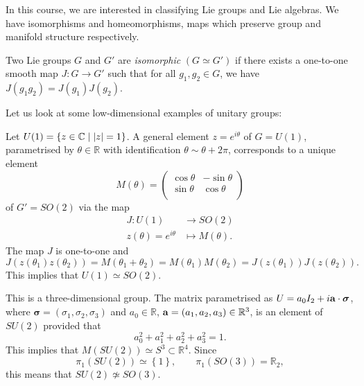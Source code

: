 In this course, we are interested in classifying Lie groups and Lie algebras. We have isomorphisms and homeomorphisms, maps which preserve group and manifold structure respectively.

\begin{definition}[isomorphism]
  Two Lie groups $G$ and $G'$ are \emph{isomorphic} $(G \simeq G')$ if there exists a one-to-one smooth map $J : G \to G'$ such that for all $g_1, g_2 \in G$, we have $J(g_1 g_2) = J(g_1) J(g_2)$.
\end{definition}

Let us look at some low-dimensional examples of unitary groups:
\begin{example}[$G = U(1)$]
  Let $U(1) = \left\{ z \in \mathbb{C} \mid \abs{z} = 1 \right\}$. A general element $z = e^{i \theta}$ of $G = U(1)$, parametrised by $\theta \in \mathbb{R}$ with identification $\theta \sim \theta + 2\pi$, corresponds to a unique element
  \begin{equation}
    M(\theta) =
    \begin{pmatrix}
     \cos\theta & -\sin\theta \\
     \sin\theta & \cos\theta \\
    \end{pmatrix}
  \end{equation}
  of $G' = SO(2)$ via the map
  \begin{equation}
    \begin{split}
      J \colon U(1) &\to SO(2) \\
      z(\theta) = e^{i\theta} &\mapsto M(\theta).
    \end{split}
  \end{equation}
  The map $J$ is one-to-one and
  \begin{equation}
    J(z(\theta_1) z(\theta_2)) = M(\theta_1 + \theta_2) = M(\theta_1) M(\theta_2) = J(z(\theta_1)) J(z(\theta_2)).
  \end{equation}
  This implies that $U(1) \simeq SO(2)$.
\end{example}

\begin{example}[$G = SU(2)$]
  This is a three-dimensional group. The matrix parametrised as $U = a_0 I_2 + i \vb{a} \cdot \boldsymbol\sigma$, where $\boldsymbol\sigma = (\sigma_1, \sigma_2, \sigma_3)$ and $a_0 \in \mathbb{R}$, $\vb{a} = (a_1, a_2, a_3) \in \mathbb{R}^3$, is an element of $SU(2)$ provided that 
  \begin{equation}
    a_0^2 + a_1^2 + a_2^2 + a_3^2 = 1.
  \end{equation}
  This implies that $M(SU(2)) \simeq S^3 \subset \mathbb{R}^4$.
  Since 
  \begin{equation}
    \pi_1(SU(2)) \simeq \left\{ 1 \right\}, \qquad \pi_1(SO(3)) = \mathbb{R}_2,
  \end{equation}
  this means that $SU(2) \not\simeq SO(3)$.
\end{example}

